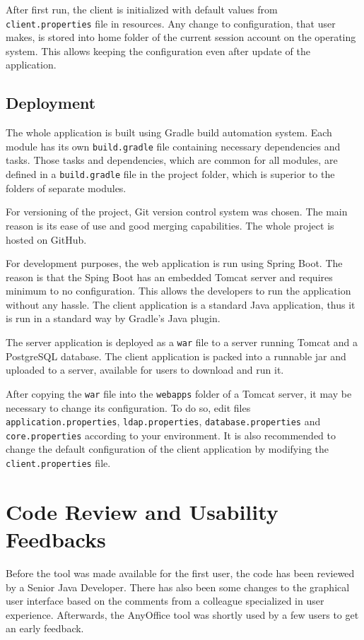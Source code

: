 \documentclass[11pt,singleside]{myfithesis2}
\begin{document}
After first run, the client is initialized with default values from \texttt{client.properties} file in resources. Any change to configuration, that user makes, is stored into home folder of the current session account on the operating system. This allows keeping the configuration even after update of the application.

		\subsection{Deployment}\label{deployment}
The whole application is built using Gradle build automation system. Each module has its own \texttt{build.gradle} file containing necessary dependencies and tasks. Those tasks and dependencies, which are common for all modules, are defined in a \texttt{build.gradle} file in the project folder, which is superior to the folders of separate modules.

For versioning of the project, Git version control system was chosen. The main reason is its ease of use and good merging capabilities. The whole project is hosted on GitHub.

For development purposes, the web application is run using Spring Boot. The reason is that the Sping Boot has an embedded Tomcat server and requires minimum to no configuration. This allows the developers to run the application without any hassle. The client application is a standard Java application, thus it is run in a standard way by Gradle's Java plugin.

The server application is deployed as a \texttt{war} file to a server running Tomcat and a PostgreSQL database. The client application is packed into a runnable jar and uploaded to a server, available for users to download and run it.

After copying the \texttt{war} file into the \texttt{webapps} folder of a Tomcat server, it may be necessary to change its configuration. To do so, edit files \texttt{application.properties}, \texttt{ldap.properties}, \texttt{database.properties} and \texttt{core.properties} according to your environment. It is also recommended to change the default configuration of the client application by modifying the \texttt{client.properties} file.
	
	\section{Code Review and Usability Feedbacks}

Before the tool was made available for the first user, the code has been reviewed by a Senior Java Developer. There has also been some changes to the graphical user interface based on the comments from a colleague specialized in user experience. Afterwards, the AnyOffice tool was shortly used by a few users to get an early feedback.
\end{document}
